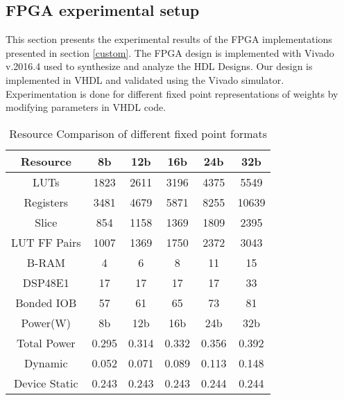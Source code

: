 \subsection{FPGA experimental setup}\label{fpga_results}
This section presents the experimental results of the FPGA implementations presented in section \ref{custom}. The FPGA design is implemented with Vivado v.2016.4 used to synthesize and analyze the HDL Designs. Our design is implemented in VHDL and validated using the Vivado simulator. Experimentation is done for different fixed point representations of weights by modifying parameters in VHDL code. 

\begin{table}[h!]
	\centering
	\caption{Resource Comparison of different fixed point formats}
	\label{table:somFpgaRes}
	\begin{tabular}{ c |c | c| c |c | c } 
		\toprule
		Resource & 8b & 12b & 16b & 24b & 32b \\ 
		\midrule
		LUTs & 1823 & 2611 &3196 & 4375 & 5549 \\
		\hline
		Registers & 3481 & 4679 & 5871 & 8255 & 10639 \\ 
		\hline
		Slice & 854 & 1158 & 1369 &1809 & 2395 \\ 
		\hline
		LUT FF Pairs & 1007 & 1369 & 1750 & 2372 & 3043 \\
		\hline
		B-RAM & 4 & 6 & 8 & 11 & 15 \\
		\hline
		DSP48E1 & 17 & 17 & 17 & 17 & 33 \\
		\hline
		Bonded IOB & 57 & 61 & 65 & 73 & 81 \\
		\midrule
	
		\midrule
		Power(W) & 8b & 12b & 16b & 24b & 32b \\ 
		\midrule
		Total Power & 0.295 &0.314 &0.332 &0.356 &0.392 \\
		\hline
		Dynamic &0.052 &0.071 &0.089 &0.113 &0.148 \\ 
		\hline
		Device Static &0.243 &0.243 &0.243 &0.244 &0.244 \\ 
		\bottomrule
	\end{tabular}
\end{table}

